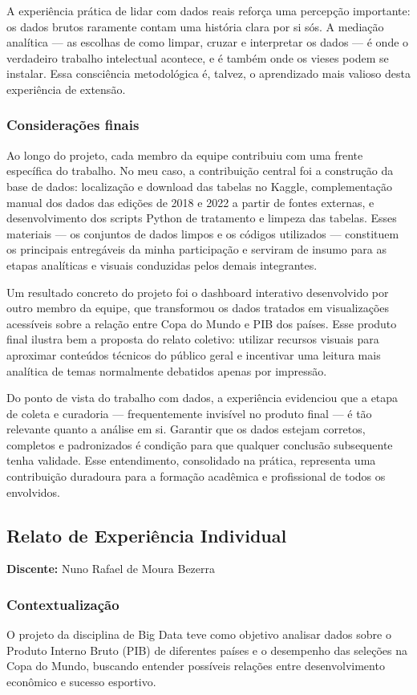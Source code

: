 \documentclass[12pt, a4paper, brazil]{article}
\begin{document}
A experiência prática de lidar com dados reais reforça uma percepção importante: os dados brutos raramente contam uma história clara por si sós. A mediação analítica — as escolhas de como limpar, cruzar e interpretar os dados — é onde o verdadeiro trabalho intelectual acontece, e é também onde os vieses podem se instalar. Essa consciência metodológica é, talvez, o aprendizado mais valioso desta experiência de extensão.

\subsubsection{Considerações finais}
Ao longo do projeto, cada membro da equipe contribuiu com uma frente específica do trabalho. No meu caso, a contribuição central foi a construção da base de dados: localização e download das tabelas no Kaggle, complementação manual dos dados das edições de 2018 e 2022 a partir de fontes externas, e desenvolvimento dos scripts Python de tratamento e limpeza das tabelas. Esses materiais — os conjuntos de dados limpos e os códigos utilizados — constituem os principais entregáveis da minha participação e serviram de insumo para as etapas analíticas e visuais conduzidas pelos demais integrantes.

Um resultado concreto do projeto foi o dashboard interativo desenvolvido por outro membro da equipe, que transformou os dados tratados em visualizações acessíveis sobre a relação entre Copa do Mundo e PIB dos países. Esse produto final ilustra bem a proposta do relato coletivo: utilizar recursos visuais para aproximar conteúdos técnicos do público geral e incentivar uma leitura mais analítica de temas normalmente debatidos apenas por impressão.

Do ponto de vista do trabalho com dados, a experiência evidenciou que a etapa de coleta e curadoria — frequentemente invisível no produto final — é tão relevante quanto a análise em si. Garantir que os dados estejam corretos, completos e padronizados é condição para que qualquer conclusão subsequente tenha validade. Esse entendimento, consolidado na prática, representa uma contribuição duradoura para a formação acadêmica e profissional de todos os envolvidos.

\subsection{Relato de Experiência Individual}
\textbf{Discente:} Nuno Rafael de Moura Bezerra

\subsubsection{Contextualização}
O projeto da disciplina de Big Data teve como objetivo analisar dados sobre o Produto Interno Bruto (PIB) de diferentes países e o desempenho das seleções na Copa do Mundo, buscando entender possíveis relações entre desenvolvimento econômico e sucesso esportivo.
\end{document}
